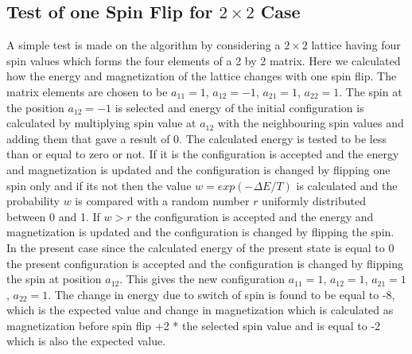 \subsection{Test of one Spin Flip for $2\times 2$ Case}
\label{Test2times2OneFlip}
A simple test is made on the algorithm by considering a $2\times 2$ lattice having four spin values which forms the four elements of a 2 by 2 matrix. 
Here we calculated how the energy and magnetization of the lattice changes with one spin flip. 
The matrix elements are chosen to be $a_{11} = 1$, $a_{12} = -1$, $a_{21} = 1$, $a_{22} = 1$. 
The spin at the position $a_{12} = -1$ is selected and energy of the initial configuration is calculated by multiplying spin value at $a_{12}$ with the neighbouring spin values and adding them that gave a result of 0. 
The calculated energy is tested to be less than or equal to zero or not. 
If it is the configuration is accepted and the energy and magnetization  is updated and the configuration is changed by flipping one spin only and if its not then the value $w = exp(-\Delta E/T)$ is calculated and the probability $w$ is compared with a random number $r$ uniformly distributed between 0 and 1. 
If $w > r$ the configuration is accepted and the energy and magnetization is updated and the configuration is changed by flipping the spin. 
In the present case since the calculated energy of the present state is equal to  0 the present configuration is accepted and the configuration is changed by flipping the spin at position $a_{12}$. 
This gives the new configuration $a_{11} = 1$, $a_{12} = 1$, $a_21 = 1$, $a_{22} = 1$. 
The change in energy due to switch of spin is found to be equal to -8, which is the expected value and change in magnetization which is calculated as magnetization before spin flip +2 * the selected spin value and  is equal to -2 which is also the expected value.

